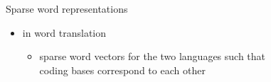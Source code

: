 \documentclass{beamer}
\newlength{\onecolwid}
\newcommand{\bull}[1]{
  \begin{itemize}
    \item #1
  \end{itemize}
}
\begin{document}
\begin{frame}[t]
\begin{columns}[t]
\begin{column}{\onecolwid}
\begin{block}{Sparse word representations}
\begin{itemize}
\begin{itemize}
                \begin{quotation}
                  to describe the city of Pittsburgh, one might talk about phenomena
                  typical of the city, like erratic weather and large bridges. It is
                  redundant and inefficient to list negative properties, like the
                  absence of the Statue of Liberty 
                    \begin{flushright} \citep{Subramanian:2018}\end{flushright}
                \end{quotation}

              \item in word translation \citep{Berend:2018}
                \bull{sparse word vectors for the two languages such that \\ coding
                bases correspond to each other}
            \end{itemize}
        \end{itemize}
      \end{block}


\end{column}
\end{columns}
\end{frame}
\end{document}
